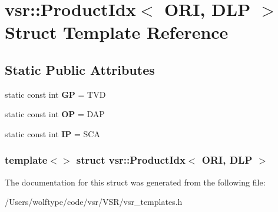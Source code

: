 \hypertarget{structvsr_1_1_product_idx_3_01_o_r_i_00_01_d_l_p_01_4}{\section{vsr\-:\-:Product\-Idx$<$ O\-R\-I, D\-L\-P $>$ Struct Template Reference}
\label{structvsr_1_1_product_idx_3_01_o_r_i_00_01_d_l_p_01_4}
}
\subsection*{Static Public Attributes}
\begin{DoxyCompactItemize}
\item 
\hypertarget{structvsr_1_1_product_idx_3_01_o_r_i_00_01_d_l_p_01_4_aa7f71126f023a27fd39cfb77bf00c501}{static const int {\bfseries G\-P} = T\-V\-D}\label{structvsr_1_1_product_idx_3_01_o_r_i_00_01_d_l_p_01_4_aa7f71126f023a27fd39cfb77bf00c501}

\item 
\hypertarget{structvsr_1_1_product_idx_3_01_o_r_i_00_01_d_l_p_01_4_a1de73138d5d64aa3beae1099fee47503}{static const int {\bfseries O\-P} = D\-A\-P}\label{structvsr_1_1_product_idx_3_01_o_r_i_00_01_d_l_p_01_4_a1de73138d5d64aa3beae1099fee47503}

\item 
\hypertarget{structvsr_1_1_product_idx_3_01_o_r_i_00_01_d_l_p_01_4_a4040c7558479298b527387272b18c036}{static const int {\bfseries I\-P} = S\-C\-A}\label{structvsr_1_1_product_idx_3_01_o_r_i_00_01_d_l_p_01_4_a4040c7558479298b527387272b18c036}

\end{DoxyCompactItemize}
\subsubsection*{template$<$$>$ struct vsr\-::\-Product\-Idx$<$ O\-R\-I, D\-L\-P $>$}



The documentation for this struct was generated from the following file\-:\begin{DoxyCompactItemize}
\item 
/\-Users/wolftype/code/vsr/\-V\-S\-R/vsr\-\_\-templates.\-h\end{DoxyCompactItemize}
